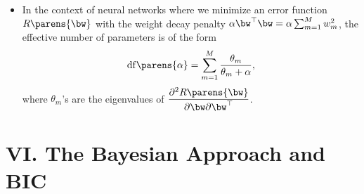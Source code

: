 \documentclass[12pt]{article}
\begin{document}
\begin{enumerate}[label=\textbf{\arabic*.}]
\begin{itemize}
		\item In the context of neural networks where we minimize an error function $R \parens{\bw}$ with the weight decay penalty $\alpha \bw^\top \bw = \alpha \sum_{m=1}^M w_m^2$, the effective number of parameters is of the form 
		\begin{align*}
			\mathrm{df} \parens{\alpha} = \sum_{m=1}^M \frac{\theta_m}{\theta_m + \alpha}, 
		\end{align*}
		where $\theta_m$'s are the eigenvalues of $\dfrac{\partial^2 R \parens{\bw}}{\partial \bw \partial \bw^\top}$. 
	\end{itemize}
	
\end{enumerate}


\section*{VI. The Bayesian Approach and BIC}
\end{document}
